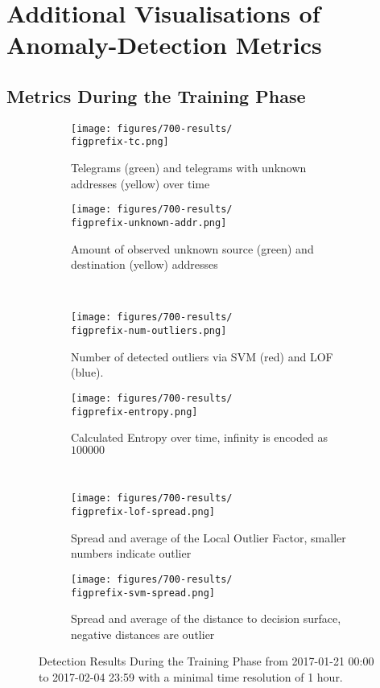 \chapter{Additional Visualisations of Anomaly-Detection Metrics}
\label{app:metrics}
\newpage

\section{Metrics During the Training Phase}
\label{app:metrics:training}

\begin{figure}[H]
	\newcommand{\figwith}{0.49\textwidth}
	\newcommand{\figprefix}{train}
	\centering
	
	\begin{subfigure}[b]{\figwith}
		\texttt{[image: figures/700-results/\\figprefix-tc.png]}
		\caption{Telegrams (green) and telegrams with unknown addresses (yellow) over time}
		\label{fig:results:\figprefix:tc}
	\end{subfigure}
	\hfil
	\begin{subfigure}[b]{\figwith}
		\texttt{[image: figures/700-results/\\figprefix-unknown-addr.png]}
		\caption{Amount of observed unknown source (green) and destination (yellow) addresses}
		\label{fig:results:\figprefix:addr}
	\end{subfigure}
	\\[1.5mm]
	\begin{subfigure}[b]{\figwith}
		\texttt{[image: figures/700-results/\\figprefix-num-outliers.png]}
		\caption{Number of detected outliers via SVM (red) and LOF (blue).}
		\label{fig:results:\figprefix:outlier}
	\end{subfigure}
	\hfil
	\begin{subfigure}[b]{\figwith}
		\texttt{[image: figures/700-results/\\figprefix-entropy.png]}
		\caption{Calculated Entropy over time, infinity is encoded as $100 000$}
		\label{fig:results:\figprefix:entropy}
	\end{subfigure}
	\\[1.5mm]
	\begin{subfigure}[b]{\figwith}
		\texttt{[image: figures/700-results/\\figprefix-lof-spread.png]}
		\caption{Spread and average of the Local Outlier Factor, smaller numbers indicate outlier}
		\label{fig:results:\figprefix:lof}
	\end{subfigure}
	\hfil
	\begin{subfigure}[b]{\figwith}
		\texttt{[image: figures/700-results/\\figprefix-svm-spread.png]}
		\caption{Spread and average of the distance to decision surface, negative distances are outlier}
		\label{fig:results:\figprefix:svm}
	\end{subfigure}
	
	\caption[Detection Results During the Training Phase]{Detection Results During the Training Phase from 2017-01-21 00:00 to 2017-02-04 23:59 with a minimal time resolution of 1 hour.}
	\label{fig:results:\figprefix}
	
\end{figure}

